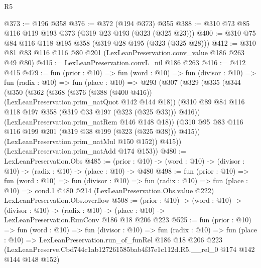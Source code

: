 \begin{lexlean}{R5}
\begin{coremodule}
@373 := @196 @358
@376 := @372 (@194 @373) @355
@388 := @310 @73 @85 @116 @119 @193 @373 (@319 @23 @193 (@323 (@325 @23)))
@400 := @310 @75 @84 @116 @118 @195 @358 (@319 @28 @195 (@323 (@325 @28)))
@412 := @310 @81 @83 @116 @116 @80 @201 (LexLeanPreservation.conv_value @186 @263 @49 @80)
@415 := LexLeanPreservation.convL_nil @186 @263
@416 := @412 @415
@479 := fun (prior : @10) =>
  fun (word : @10) =>
  fun (divisor : @10) =>
  fun (radix : @10) =>
  fun (place : @10) =>
  @293
    (@307
      (@329
        (@335
          (@344
            (@350
              (@362
                (@368
                  (@376 (@388 (@400 @416)) (LexLeanPreservation.prim_natQuot @142 @144 @18))
                  (@310 @89 @84 @116 @118 @197 @358 (@319 @33 @197 (@323 (@325 @33))) @416))
                (LexLeanPreservation.prim_natRem @146 @148 @18))
              (@310 @95 @83 @116 @116 @199 @201 (@319 @38 @199 (@323 (@325 @38))) @415))
            (LexLeanPreservation.prim_natMul @150 @152))
          @415))
      (LexLeanPreservation.prim_natAdd @174 @153))
@480 := LexLeanPreservation.Obs
@485 := (prior : @10) -> (word : @10) -> (divisor : @10) -> (radix : @10) -> (place : @10) -> @480
@498 := fun (prior : @10) =>
  fun (word : @10) =>
  fun (divisor : @10) =>
  fun (radix : @10) =>
  fun (place : @10) =>
  cond.{1} @480 @214 (LexLeanPreservation.Obs.value @222) LexLeanPreservation.Obs.overflow
@508 := (prior : @10) ->
  (word : @10) ->
  (divisor : @10) ->
  (radix : @10) -> (place : @10) -> LexLeanPreservation.RunConv @186 @18 @206 @223
@525 := fun (prior : @10) =>
  fun (word : @10) =>
  fun (divisor : @10) =>
  fun (radix : @10) =>
  fun (place : @10) =>
  LexLeanPreservation.run_of_funRel
    @186
    @18
    @206
    @223
    (LexLeanPreserve.Cbd744c1ab127261585bab4f37e1c112d.R5.__rel_0 @174 @142 @144 @148 @152)
\end{coremodule}
\end{lexlean}
